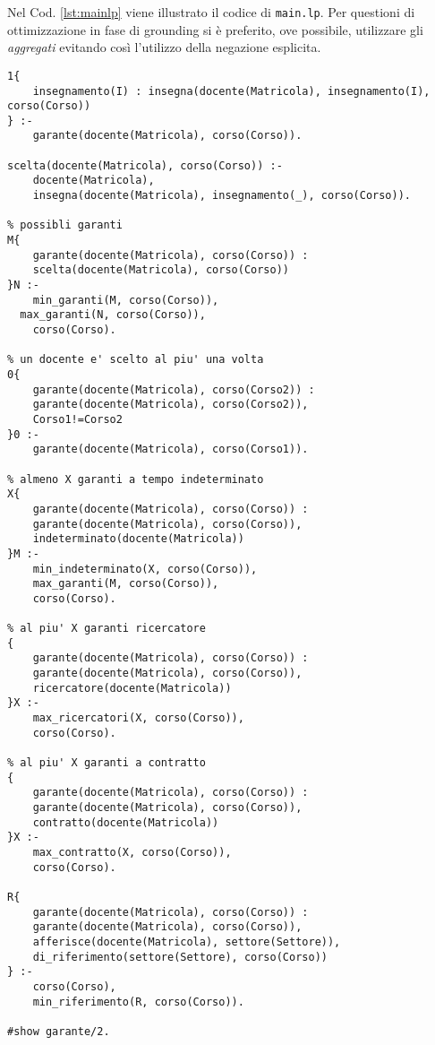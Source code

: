 Nel Cod. \ref{lst:mainlp} viene illustrato il codice di \texttt{main.lp}. Per
questioni di ottimizzazione in fase di grounding si è preferito, ove possibile, utilizzare gli
\textit{aggregati} evitando così l'utilizzo della negazione esplicita.

\begin{center}
\begin{lstlisting}[style=asp, caption={Codice ASP del file \texttt{main.lp}.}, label={lst:mainlp}]
% se garante, allora insegna almeno una materia in quel corso
1{
	insegnamento(I) : insegna(docente(Matricola), insegnamento(I), corso(Corso))
} :-
	garante(docente(Matricola), corso(Corso)).

scelta(docente(Matricola), corso(Corso)) :-
	docente(Matricola),
	insegna(docente(Matricola), insegnamento(_), corso(Corso)).

% possibli garanti
M{
	garante(docente(Matricola), corso(Corso)) :
	scelta(docente(Matricola), corso(Corso))
}N :-
	min_garanti(M, corso(Corso)),
  max_garanti(N, corso(Corso)),
	corso(Corso).

% un docente e' scelto al piu' una volta
0{
	garante(docente(Matricola), corso(Corso2)) :
	garante(docente(Matricola), corso(Corso2)),
	Corso1!=Corso2
}0 :-
	garante(docente(Matricola), corso(Corso1)).

% almeno X garanti a tempo indeterminato
X{
	garante(docente(Matricola), corso(Corso)) :
	garante(docente(Matricola), corso(Corso)),
	indeterminato(docente(Matricola))
}M :-
	min_indeterminato(X, corso(Corso)),
	max_garanti(M, corso(Corso)),
	corso(Corso).

% al piu' X garanti ricercatore
{
	garante(docente(Matricola), corso(Corso)) :
	garante(docente(Matricola), corso(Corso)),
	ricercatore(docente(Matricola))
}X :-
	max_ricercatori(X, corso(Corso)),
	corso(Corso).

% al piu' X garanti a contratto
{
	garante(docente(Matricola), corso(Corso)) :
	garante(docente(Matricola), corso(Corso)),
	contratto(docente(Matricola))
}X :-
	max_contratto(X, corso(Corso)),
	corso(Corso).

R{
	garante(docente(Matricola), corso(Corso)) :
	garante(docente(Matricola), corso(Corso)),
	afferisce(docente(Matricola), settore(Settore)),
	di_riferimento(settore(Settore), corso(Corso))
} :-
	corso(Corso),
	min_riferimento(R, corso(Corso)).

#show garante/2.
\end{lstlisting}
\end{center}

